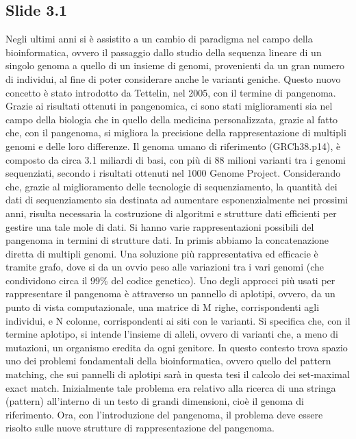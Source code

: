 \documentclass[a4paper,11pt, oneside,italian]{article}
\begin{document}
\subsection*{Slide 3.1}
Negli ultimi anni si è assistito a un cambio di paradigma nel campo della
bioinformatica, ovvero il passaggio dallo studio della sequenza lineare di un
singolo genoma a quello di un insieme di genomi, provenienti da un gran numero
di individui, al fine di poter considerare anche le varianti geniche. Questo
nuovo concetto è stato introdotto da Tettelin, nel 2005, con il termine di
pangenoma. Grazie ai risultati ottenuti in pangenomica, ci sono stati
miglioramenti sia nel campo della biologia che in quello della medicina
personalizzata, grazie al fatto che, con il pangenoma, si migliora la precisione
della rappresentazione di multipli genomi e delle loro differenze.
{\color{gray}Il genoma
umano di riferimento (GRCh38.p14), è composto da circa 3.1 miliardi di basi, con
più di 88 milioni varianti tra i genomi sequenziati, secondo i risultati
ottenuti nel 1000 Genome Project. Considerando che, grazie al miglioramento
delle tecnologie di sequenziamento, la quantità dei dati di sequenziamento sia
destinata ad aumentare esponenzialmente nei prossimi anni, risulta necessaria la
costruzione di algoritmi e strutture dati eﬀicienti per gestire una tale mole di
dati.}
Si hanno varie rappresentazioni possibili del pangenoma in termini di strutture
dati. In primis abbiamo la concatenazione diretta di multipli genomi. Una
soluzione più rappresentativa ed efficacie è tramite grafo, dove si da un ovvio
peso alle variazioni tra i vari genomi (che condividono circa il 99\% del codice
genetico).
Uno degli approcci più usati per rappresentare il
pangenoma è attraverso un pannello di aplotipi, ovvero, da un punto di vista
computazionale, una matrice di M righe, corrispondenti agli individui, e N
colonne, corrispondenti ai siti con le varianti. Si specifica che, con il
termine aplotipo, si intende l'insieme di alleli, ovvero di varianti che, a meno
di mutazioni, un organismo eredita da ogni genitore.
In questo contesto trova spazio uno dei problemi fondamentali della
bioinformatica, ovvero quello del pattern matching, che sui pannelli di aplotipi
sarà in questa tesi il calcolo dei set-maximal exact match. {\color{gray}
  Inizialmente 
  tale problema 
  era relativo alla ricerca di una stringa (pattern) all'interno di un testo di
  grandi dimensioni, cioè il genoma di riferimento. Ora, con l'introduzione del
  pangenoma, il problema deve essere risolto sulle nuove strutture di
  rappresentazione del pangenoma.}
\end{document}
